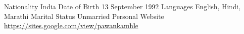 

\begin{cvskills}

    \cvskill
    {Nationality} %
    {India} %
    \cvskill
    {Date of Birth} %
    {13 September 1992} %
    \cvskill
    {Languages} %
    {English, Hindi, Marathi} %
    \cvskill
    {Marital Status} %
    {Unmarried} %
 \cvskill
    {Personal Website} %
    {\href{https://sites.google.com/view/pawankamble}{\color{blue}https://sites.google.com/view/pawankamble}} %
\end{cvskills}
